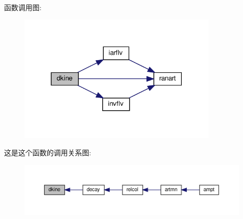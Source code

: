 函数调用图\+:
\nopagebreak
\begin{figure}[H]
\begin{center}
\leavevmode
\includegraphics[width=273pt]{dkine_8f90_a6ec7cb327d5efeb499a7c95b630aa375_cgraph}
\end{center}
\end{figure}
这是这个函数的调用关系图\+:
\nopagebreak
\begin{figure}[H]
\begin{center}
\leavevmode
\includegraphics[width=350pt]{dkine_8f90_a6ec7cb327d5efeb499a7c95b630aa375_icgraph}
\end{center}
\end{figure}
